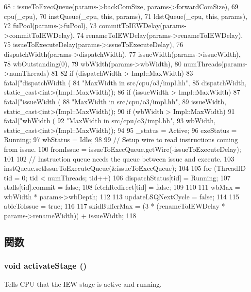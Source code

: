 \begin{DoxyCode}
68     : issueToExecQueue(params->backComSize, params->forwardComSize),
69       cpu(_cpu),
70       instQueue(_cpu, this, params),
71       ldstQueue(_cpu, this, params),
72       fuPool(params->fuPool),
73       commitToIEWDelay(params->commitToIEWDelay),
74       renameToIEWDelay(params->renameToIEWDelay),
75       issueToExecuteDelay(params->issueToExecuteDelay),
76       dispatchWidth(params->dispatchWidth),
77       issueWidth(params->issueWidth),
78       wbOutstanding(0),
79       wbWidth(params->wbWidth),
80       numThreads(params->numThreads)
81 {
82     if (dispatchWidth > Impl::MaxWidth)
83         fatal("dispatchWidth (%
84              "\tincrease MaxWidth in src/cpu/o3/impl.hh\n",
85              dispatchWidth, static_cast<int>(Impl::MaxWidth));
86     if (issueWidth > Impl::MaxWidth)
87         fatal("issueWidth (%
88              "\tincrease MaxWidth in src/cpu/o3/impl.hh\n",
89              issueWidth, static_cast<int>(Impl::MaxWidth));
90     if (wbWidth > Impl::MaxWidth)
91         fatal("wbWidth (%
92              "\tincrease MaxWidth in src/cpu/o3/impl.hh\n",
93              wbWidth, static_cast<int>(Impl::MaxWidth));
94 
95     _status = Active;
96     exeStatus = Running;
97     wbStatus = Idle;
98 
99     // Setup wire to read instructions coming from issue.
100     fromIssue = issueToExecQueue.getWire(-issueToExecuteDelay);
101 
102     // Instruction queue needs the queue between issue and execute.
103     instQueue.setIssueToExecuteQueue(&issueToExecQueue);
104 
105     for (ThreadID tid = 0; tid < numThreads; tid++) {
106         dispatchStatus[tid] = Running;
107         stalls[tid].commit = false;
108         fetchRedirect[tid] = false;
109     }
110 
111     wbMax = wbWidth * params->wbDepth;
112 
113     updateLSQNextCycle = false;
114 
115     ableToIssue = true;
116 
117     skidBufferMax = (3 * (renameToIEWDelay * params->renameWidth)) + issueWidth;
118 }
\end{DoxyCode}


\subsection{関数}
\hypertarget{classDefaultIEW_adeab5540b89c1c9defd0d910d9b39e10}{
\subsubsection[{activateStage}]{\setlength{\rightskip}{0pt plus 5cm}void activateStage ()}}
\label{classDefaultIEW_adeab5540b89c1c9defd0d910d9b39e10}
Tells CPU that the IEW stage is active and running. 


